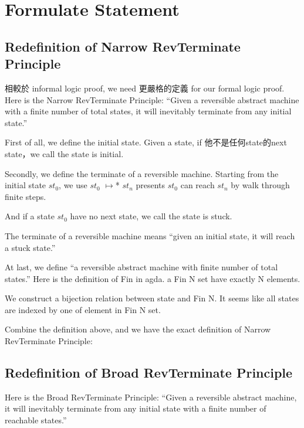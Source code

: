 \section{Formulate Statement}

\subsection{ Redefinition of Narrow RevTerminate Principle}
相較於 informal logic proof, we need 更嚴格的定義 for our formal logic proof.
Here is the Narrow RevTerminate Principle:
``Given a reversible abstract machine with a finite number of total states, it will inevitably terminate from any initial state.''

First of all, we define the initial state.  Given a state, if 他不是任何state的next state，we call the state is initial.


Secondly, we define the terminate of a reversible machine.
Starting from the initial state $st_{0}$, we use $st_{0}$ $\mapsto$* $st_{n}$ presents $st_{0}$ can reach $st_{n}$ by walk through finite steps.


And if a state $st_{0}$ have no next state, we call the state is stuck.


The terminate of a reversible machine means ``given an initial state, it will reach a stuck state.''


At last, we define ``a reversible abstract machine with finite number of total states.''
Here is the definition of Fin in agda.  a Fin N set have exactly N elements.


We construct a bijection relation between state and Fin N.
It seems like all states are indexed by one of element in Fin N set.


Combine the definition above, and we have the exact definition of Narrow RevTerminate Principle:


\subsection{ Redefinition of Broad RevTerminate Principle}
Here is the Broad RevTerminate Principle:
``Given a reversible abstract machine, it will inevitably terminate from any initial state with a finite number of reachable states.''

